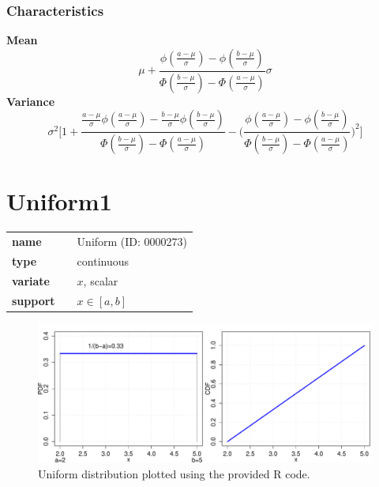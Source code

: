\subsubsection*{Characteristics}
\smallskip \noindent \hspace{.2cm} \textbf{Mean} 
\begin{equation*}
\mu + \frac{ \phi(\frac{a-\mu}{\sigma}) - \phi(\frac{b-\mu}{\sigma}) }{ \Phi(\frac{b-\mu}{\sigma}) - \Phi(\frac{a-\mu}{\sigma}) } \sigma
\end{equation*}
\smallskip \noindent \hspace{.2cm} \textbf{Variance} 
\begin{equation*}\sigma^2 \Big[ 1 
+ \frac{ \frac{a-\mu}{\sigma}\phi(\frac{a-\mu}{\sigma}) - \frac{b-\mu}{\sigma}\phi(\frac{b-\mu}{\sigma}) }{ \Phi(\frac{b-\mu}{\sigma}) - \Phi(\frac{a-\mu}{\sigma}) } 
- \Big( \frac{ \phi(\frac{a-\mu}{\sigma}) - \phi(\frac{b-\mu}{\sigma}) }{ \Phi(\frac{b-\mu}{\sigma}) - \Phi(\frac{a-\mu}{\sigma}) } \Big)^2 \Big]\end{equation*}
\smallskip
\section*{Uniform1} 

  \bigskip 

\begin{tabular}{p{2cm}cl}
\textbf{name} & & Uniform (ID: 0000273)\\ 
 
\textbf{type} & & continuous \\ 

\textbf{variate} & & $x$, scalar \\ 

\textbf{support} & & $x \in [a,b]$
\end{tabular}

\begin{figure}[ht!]
\centering
  \includegraphics[width=140mm]{pics/Uniform.pdf}
 \caption{Uniform distribution plotted using the provided R code.}
 \label{fig:Uniform}
\end{figure}

